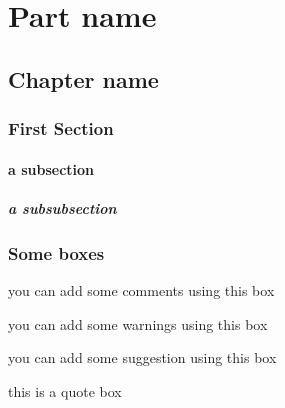 \documentclass[10pt,a4paper,openany]{book}
\begin{document}
\selectfont %
\frontmatter

\rpgMakeCover[
    image = img/cover,
    logo = img/logo,
    title = Rpg Template,
    subtitle = Created by Krozark the \today\\with XeTeX\\\url{https://github.com/Krozark/RPG-LaTeX-Template}
]


\tableofcontents

\mainmatter
\part{Part name}
\chapter{Chapter name}

\section{First Section}
\lipsum[2]

\subsection{a subsection}
\subsubsection{a subsubsection}


\section{Some boxes}

\begin{rpg-commentbox}
	you can add some comments using this box
\end{rpg-commentbox}

\begin{rpg-warnbox}
	you can add some warnings using this box
\end{rpg-warnbox}

\begin{rpg-suggestionbox}
	you can add some suggestion using this box
\end{rpg-suggestionbox}

\begin{rpg-quotebox}
    this is a quote box
\end{rpg-quotebox}
\end{document}
